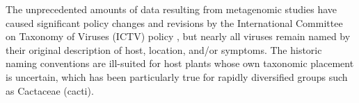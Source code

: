 \documentclass[fleqn,10pt,lineno]{wlpeerj}
\begin{document}
%


The unprecedented amounts of data resulting from metagenomic studies have caused significant policy changes and revisions by the International Committee on Taxonomy of Viruses (ICTV) policy \citep{ictv2020,simmonds2017virus}, but nearly all viruses remain named by their original description of host, location, and/or symptoms.
The historic naming conventions are ill-suited for host plants whose own taxonomic placement is uncertain, which has been particularly true for rapidly diversified groups such as Cactaceae (cacti).
\end{document}
